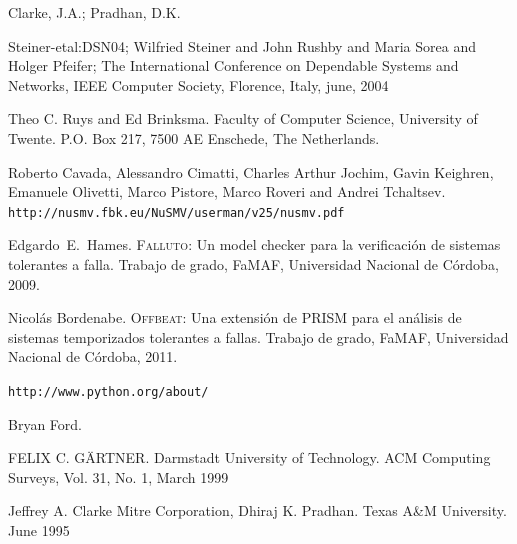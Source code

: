 \documentclass[titlepage, 12pt]{book}
\begin{document}
\newpage %

\begin{thebibliography}{99}


Clarke, J.A.; Pradhan, D.K.


Steiner-etal:DSN04; Wilfried Steiner and John Rushby and Maria Sorea and Holger Pfeifer;
\newblock The International Conference on Dependable Systems and Networks, IEEE Computer Society, Florence, Italy, june, 2004


Theo C. Ruys and Ed Brinksma.
\newblock Faculty of Computer Science, University of Twente. P.O. Box 217, 7500 AE Enschede, The Netherlands.


Roberto Cavada, Alessandro Cimatti, Charles Arthur Jochim, Gavin Keighren, Emanuele Olivetti, Marco Pistore, Marco Roveri and Andrei Tchaltsev.
\newblock \texttt{http://nusmv.fbk.eu/NuSMV/userman/v25/nusmv.pdf}


Edgardo~E.\ Hames.
\newblock \textsc{Falluto}: {U}n model checker para la verificaci\'on de
  sistemas tolerantes a falla.
\newblock Trabajo de grado, FaMAF, Universidad Nacional de C\'ordoba, 2009.


Nicol\'as Bordenabe.
\newblock \textsc{Offbeat}: {U}na extensi\'on de {PRISM} para el an\'alisis de
  sistemas temporizados tolerantes a fallas.
\newblock Trabajo de grado, FaMAF, Universidad Nacional de C\'ordoba, 2011.


\newblock \texttt{http://www.python.org/about/}


Bryan Ford.


FELIX C. GÄRTNER.
\newblock Darmstadt University of Technology. ACM Computing Surveys, Vol. 31, No. 1, March 1999


Jeffrey A. Clarke Mitre Corporation, Dhiraj K. Pradhan.
\newblock  Texas A\&M University. June 1995



\end{thebibliography}
\end{document}
